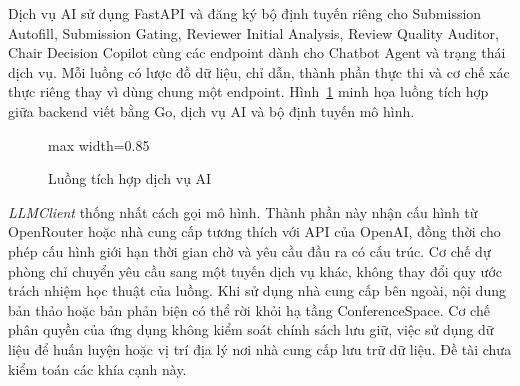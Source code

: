 Dịch vụ AI sử dụng FastAPI và đăng ký bộ định tuyến riêng cho Submission Autofill, Submission Gating, Reviewer Initial Analysis, Review Quality Auditor, Chair Decision Copilot cùng các endpoint dành cho Chatbot Agent và trạng thái dịch vụ. Mỗi luồng có lược đồ dữ liệu, chỉ dẫn, thành phần thực thi và cơ chế xác thực riêng thay vì dùng chung một endpoint. Hình~\ref{fig:ch3-31} minh họa luồng tích hợp giữa backend viết bằng Go, dịch vụ AI và bộ định tuyến mô hình.

\begin{figure}[H]
  \centering
  \begin{adjustbox}{max width=0.85\textwidth}
  \end{adjustbox}
  \caption{Luồng tích hợp dịch vụ AI}
  \label{fig:ch3-31}
\end{figure}

\textit{LLMClient} thống nhất cách gọi mô hình. Thành phần này nhận cấu hình từ OpenRouter hoặc nhà cung cấp tương thích với API của OpenAI, đồng thời cho phép cấu hình giới hạn thời gian chờ và yêu cầu đầu ra có cấu trúc. Cơ chế dự phòng chỉ chuyển yêu cầu sang một tuyến dịch vụ khác, không thay đổi quy ước trách nhiệm học thuật của luồng. Khi sử dụng nhà cung cấp bên ngoài, nội dung bản thảo hoặc bản phản biện có thể rời khỏi hạ tầng ConferenceSpace. Cơ chế phân quyền của ứng dụng không kiểm soát chính sách lưu giữ, việc sử dụng dữ liệu để huấn luyện hoặc vị trí địa lý nơi nhà cung cấp lưu trữ dữ liệu. Đề tài chưa kiểm toán các khía cạnh này.

